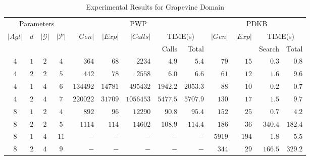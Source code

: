 \begin{table*}
    \centering
    \small
    \begin{tabular}{c@{~}c@{~}c@{~}crrrrrrrrr}
         \toprule
          \multicolumn{4}{c}{Parameters} & \multicolumn{5}{c}{PWP} & \multicolumn{4}{c}{PDKB} \\ 
          \cmidrule(lr){1-4} \cmidrule(lr){5-9} \cmidrule(lr){10-13}
          \multirow{2}{*}{$|Agt|$} & \multirow{2}{*}{$d$} & \multirow{2}{*}{$|\mathcal{G}|$} & \multirow{2}{*}{$|\mathcal{P}|$} & \multirow{2}{*}{$|Gen|$} & \multirow{2}{*}{$|Exp|$} & \multirow{2}{*}{$|Calls|$} & \multicolumn{2}{c}{TIME(s)} & \multirow{2}{*}{$|Gen|$} & \multirow{2}{*}{$|Exp|$}&\multicolumn{2}{c}{TIME(s)}
          \\ & & & & & & & {Calls} & Total & & & Search & Total \\
         \midrule

            $4$ & $1$ & $2$ & $4$ & $364$ & $68$ & $2234$ & $4.9$ & $5.4$ & $79$ & $15$ & $0.3$& $0.8$\\
            $4$ & $2$ & $2$ & $5$ & $442$ & $78$ & $2558$ & $6.0$ & $6.6$ & $61$ & $12$ & $1.6$ & $9.6$\\
            $4$ & $1$ & $4$ & $6$ & $134492$ & $14781$ & $495432$ & $1942.2$ & $2053.3$ & $88$ & $10$ & $0.2$ & $0.7$\\
            $4$ & $2$ & $4$ & $7$ & $220022$ & $31709$ & $1056453$ & $5477.5$ & $5707.9$ & $130$ & $17$ & $1.5$ & $9.7$\\
            
            $8$ & $1$ & $2$ & $4$ & $892$ & $96$ & $12290$ & $90.8$ & $95.4$ & $152$ & $25$ & $0.7$ & $4.2$\\
            $8$ & $2$ & $2$ & $5$ & $1114$ & $114$ & $14602$ & $108.9$ & $114.4$ & $186$ & $36$ & $340.4$ & $182.4$\\
            $8$ & $1$ & $4$ & $11$ & $-$ & $-$ & $-$ & $-$ & $-$ & $5919$ & $194$ & $1.8$ & $5.5$\\
            $8$ & $2$ & $4$ & $9$ & $-$ & $-$ & $-$ & $-$ & $-$ & $344$ & $29$ & $166.5$ & $329.2$\\
                  
        \bottomrule
    \end{tabular}
    \caption{Experimental Results for Grapevine Domain}
    \label{tab:grapevine}
\end{table*}
